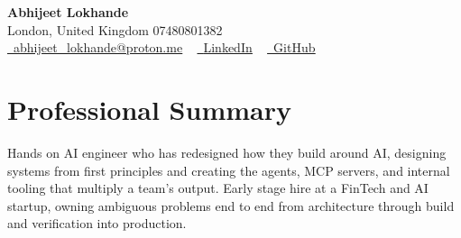\documentclass[a4paper,10pt]{article}
\begin{document}
    \begin{center}
        {\Huge\bfseries Abhijeet Lokhande}
        \\[2pt] {\color{muted}London, United Kingdom \textbar{} 07480801382}\\
        \small
        \href{mailto:abhijeet_lokhande@proton.me}{\raisebox{-0.2\height}{\color{primary}\faEnvelope}\  \underline{abhijeet\_lokhande@proton.me}} ~
        \href{https://www.linkedin.com/in/ablds/}{\raisebox{-0.2\height}{\color{primary}\faLinkedin}\ \underline{LinkedIn}}  ~
        \href{https://github.com/abhijeetscode}{\raisebox{-0.2\height}{\color{primary}\faGithub}\ \underline{GitHub}}
    \end{center}

\section{Professional Summary}
\vspace{-5pt}
{\color{muted}Hands on AI engineer who has redesigned how they build around AI, designing systems from first principles and creating the agents, MCP servers, and internal tooling that multiply a team's output. Early stage hire at a FinTech and AI startup, owning ambiguous problems end to end from architecture through build and verification into production.}
\vspace{2pt}

\end{document}

